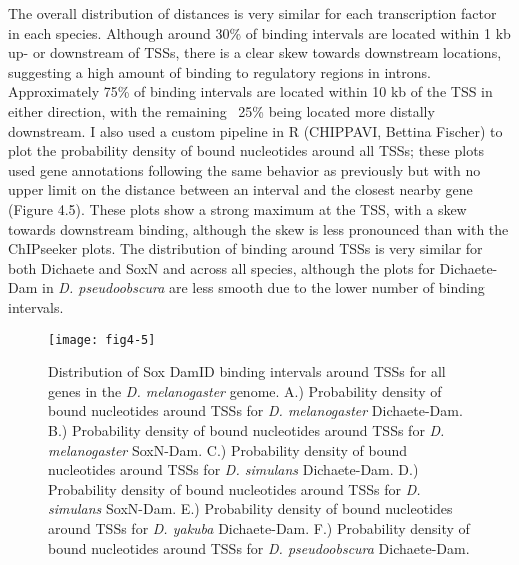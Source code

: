 The overall distribution of distances is very similar for each transcription factor in each species. Although around 30\% of binding intervals are located within 1 kb up- or downstream of TSSs, there is a clear skew towards downstream locations, suggesting a high amount of binding to regulatory regions in introns. Approximately 75\% of binding intervals are located within 10 kb of the TSS in either direction, with the remaining ~25\% being located more distally downstream. I also used a custom pipeline in R (CHIPPAVI, Bettina Fischer) to plot the probability density of bound nucleotides around all TSSs; these plots used gene annotations following the same behavior as previously but with no upper limit on the distance between an interval and the closest nearby gene (Figure 4.5). These plots show a strong maximum at the TSS, with a skew towards downstream binding, although the skew is less pronounced than with the ChIPseeker plots. The distribution of binding around TSSs is very similar for both Dichaete and SoxN and across all species, although the plots for Dichaete-Dam in \emph{D. pseudoobscura} are less smooth due to the lower number of binding intervals.\\

\begin{figure}
	\centering
	\texttt{[image: fig4-5]}
	\caption{Distribution of Sox DamID binding intervals around TSSs for all genes in the \emph{D. melanogaster} genome. A.) Probability density of bound nucleotides around TSSs for \emph{D. melanogaster} Dichaete-Dam. B.) Probability density of bound nucleotides around TSSs for \emph{D. melanogaster} SoxN-Dam. C.) Probability density of bound nucleotides around TSSs for \emph{D. simulans} Dichaete-Dam. D.) Probability density of bound nucleotides around TSSs for \emph{D. simulans} SoxN-Dam. E.) Probability density of bound nucleotides around TSSs for \emph{D. yakuba} Dichaete-Dam. F.) Probability density of bound nucleotides around TSSs for \emph{D. pseudoobscura} Dichaete-Dam.}
	\label{Figure 4.5}
\end{figure}

